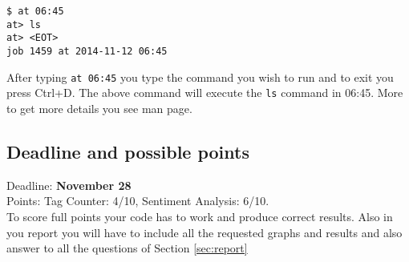 \documentclass[a4paper,10pt]{article}
\begin{document}
\lstset{language=}      
\begin{lstlisting}
$ at 06:45
at> ls 
at> <EOT>
job 1459 at 2014-11-12 06:45
\end{lstlisting}
After typing \texttt{at 06:45} you type the command you wish to run and to exit you press Ctrl+D. The above command will execute the \texttt{ls} command in 06:45. More to get more details you see man page. 


\subsection{Deadline and possible points}
Deadline: \textbf{November 28} \\
Points: Tag Counter: 4/10, Sentiment Analysis: 6/10.  \\
To score full points your code has to work and produce correct results. Also in you report you will have to include all the requested graphs and results and also answer to all the questions of Section \ref{sec:report}
\end{document}

